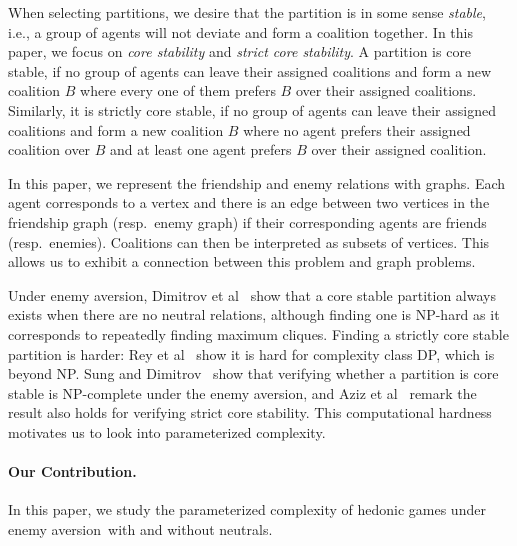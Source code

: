\documentclass[a4paper,fleqn]{cas-sc}
\newcommand{\agent}{agent\xspace}
\newcommand{\agents}{agents\xspace}
\newcommand{\blockingCoalition}{\ensuremath{B}\xspace}
\newcommand{\myemph}[1]{{\color{green!25!black}\emph{#1}}}
\newcommand{\enemyav}{enemy aversion}
\begin{document}
When selecting partitions, we desire that the partition is in some sense \myemph{stable}, i.e., a group of \agents will not deviate and form a coalition together.
In this paper, we focus on \myemph{core stability} and \myemph{strict core stability}.
A partition is core stable, if no group of agents can leave their assigned coalitions and form a new coalition \blockingCoalition where every one of them prefers \blockingCoalition over their assigned coalitions.
Similarly, it is strictly core stable, if no group of \agents can leave their assigned coalitions and form a new coalition \blockingCoalition where no \agent prefers their assigned coalition over \blockingCoalition and at least one \agent prefers \blockingCoalition over their assigned coalition.


In this paper, we represent the friendship and enemy relations with graphs. Each \agent corresponds to a vertex and there is an edge between two vertices in the friendship graph (resp.\ enemy graph) if their corresponding \agents are friends (resp.\ enemies). Coalitions can then be interpreted as subsets of vertices. This allows us to exhibit a connection between this problem and graph problems.

Under \enemyav, Dimitrov et al~\cite{dimitrov2006simple} show that a core stable partition always exists  when there are no neutral relations, 
although finding one is NP-hard as it corresponds to repeatedly finding maximum cliques.
Finding a strictly core stable partition is harder: Rey et al~\cite{rey2016toward} show it is hard for complexity class DP, which is beyond NP.
Sung and Dimitrov~\cite{sung2007core} show that verifying whether a partition is core stable is NP-complete under the \enemyav, and Aziz et al~\cite{aziz2013computing} remark the result also holds for verifying strict core stability.
This computational hardness motivates us to look into parameterized complexity.


\paragraph{Our Contribution.}
In this paper, we study the parameterized complexity of hedonic games under \enemyav\ with and without neutrals.
\end{document}
